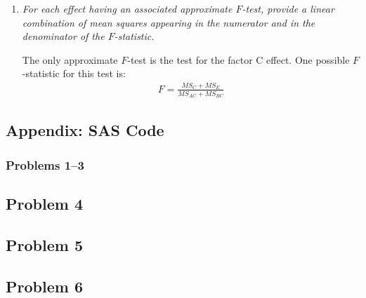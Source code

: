 \documentclass[11pt]{article}
\begin{document}
\begin{enumerate}
\begin{enumerate}
\item %
{\it For each effect having an associated approximate \(F\)-test, provide a
linear combination of mean squares appearing in the numerator and in the
denominator of the \(F\)-statistic.}

The only approximate \(F\)-test is the test for the factor C effect. One
possible \(F\)-statistic for this test is:
\begin{align*}
F=\frac{MS_{C}+MS_{E}}{MS_{AC}+MS_{BC}}
\end{align*}

\end{enumerate}

\end{enumerate}

\pagebreak
\subsection*{Appendix: SAS Code}

\subsubsection*{Problems 1--3}

\footnotesize

\subsection*{Problem 4}

\footnotesize

\pagebreak
\subsection*{Problem 5}

\footnotesize

\pagebreak
\subsection*{Problem 6}

\footnotesize
\end{document}

